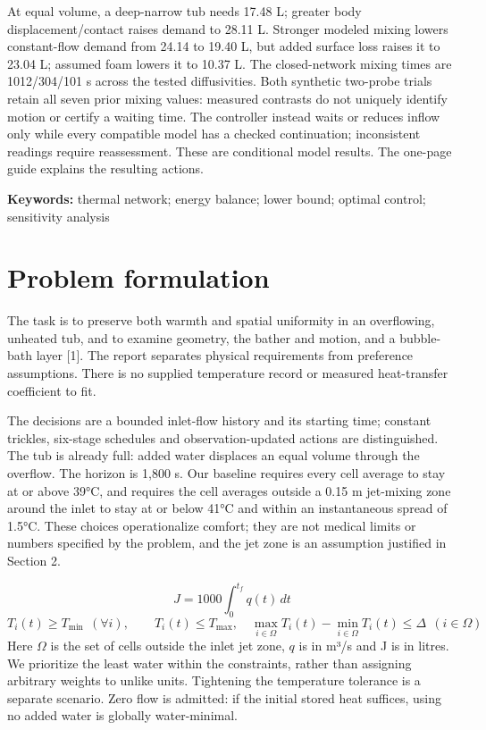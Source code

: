 \documentclass[12pt,a4paper]{article}
\begin{document}
At equal volume, a deep-narrow tub needs 17.48 L; greater body displacement/contact raises demand to 28.11 L. Stronger modeled mixing lowers constant-flow demand from 24.14 to 19.40 L, but added surface loss raises it to 23.04 L; assumed foam lowers it to 10.37 L. The closed-network mixing times are 1012/304/101 s across the tested diffusivities. Both synthetic two-probe trials retain all seven prior mixing values: measured contrasts do not uniquely identify motion or certify a waiting time. The controller instead waits or reduces inflow only while every compatible model has a checked continuation; inconsistent readings require reassessment. These are conditional model results. The one-page guide explains the resulting actions.

\textbf{Keywords:} thermal network; energy balance; lower bound; optimal control; sensitivity analysis

\clearpage\tableofcontents\clearpage
\clearpage
\section{Problem formulation}
The task is to preserve both warmth and spatial uniformity in an overflowing, unheated tub, and to examine geometry, the bather and motion, and a bubble-bath layer [1]. The report separates physical requirements from preference assumptions. There is no supplied temperature record or measured heat-transfer coefficient to fit.

The decisions are a bounded inlet-flow history and its starting time; constant trickles, six-stage schedules and observation-updated actions are distinguished. The tub is already full: added water displaces an equal volume through the overflow. The horizon is 1,800 s. Our baseline requires every cell average to stay at or above 39°C, and requires the cell averages outside a 0.15 m jet-mixing zone around the inlet to stay at or below 41°C and within an instantaneous spread of 1.5°C. These choices operationalize comfort; they are not medical limits or numbers specified by the problem, and the jet zone is an assumption justified in Section 2.

\begin{equation}J=1000\int_0^{t_f}q(t)\,dt\end{equation}
\begin{equation}T_i(t)\geq T_{\min}\ \ (\forall i),\qquad T_i(t)\leq T_{\max},\quad \max_{i\in\Omega}T_i(t)-\min_{i\in\Omega}T_i(t)\leq\Delta\ \ (i\in\Omega)\end{equation}
Here $\Omega$ is the set of cells outside the inlet jet zone, $q$ is in m³/s and J is in litres. We prioritize the least water within the constraints, rather than assigning arbitrary weights to unlike units. Tightening the temperature tolerance is a separate scenario. Zero flow is admitted: if the initial stored heat suffices, using no added water is globally water-minimal.
\end{document}
